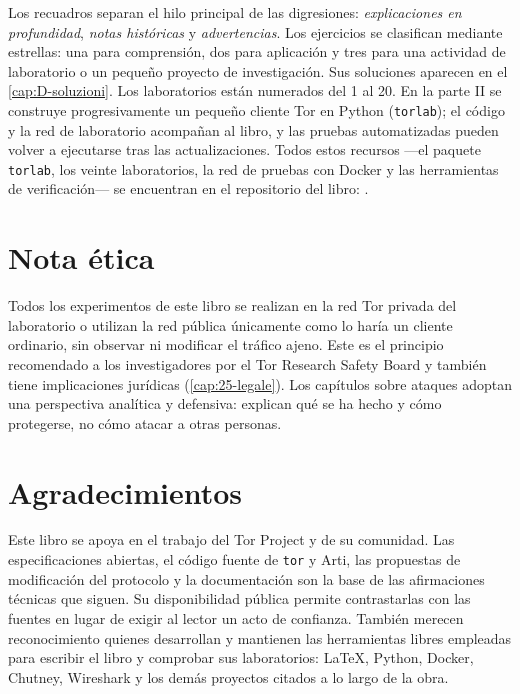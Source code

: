 Los recuadros separan el hilo principal de las digresiones: \emph{explicaciones en profundidad}, \emph{notas históricas} y \emph{advertencias}. Los ejercicios se clasifican mediante estrellas: una para comprensión, dos para aplicación y tres para una actividad de laboratorio o un pequeño proyecto de investigación. Sus soluciones aparecen en el \cref{cap:D-soluzioni}. Los laboratorios están numerados del 1 al 20. En la parte II se construye progresivamente un pequeño cliente Tor en Python (\texttt{torlab}); el código y la red de laboratorio acompañan al libro, y las pruebas automatizadas pueden volver a ejecutarse tras las actualizaciones. Todos estos recursos ---el paquete \texttt{torlab}, los veinte laboratorios, la red de pruebas con Docker y las herramientas de verificación--- se encuentran en el repositorio del libro: \repolibro.

\section*{Nota ética}

Todos los experimentos de este libro se realizan en la red Tor privada del laboratorio o utilizan la red pública únicamente como lo haría un cliente ordinario, sin observar ni modificar el tráfico ajeno. Este es el principio recomendado a los investigadores por el Tor Research Safety Board y también tiene implicaciones jurídicas (\cref{cap:25-legale}). Los capítulos sobre ataques adoptan una perspectiva analítica y defensiva: explican qué se ha hecho y cómo protegerse, no cómo atacar a otras personas.

\section*{Agradecimientos}

Este libro se apoya en el trabajo del Tor Project y de su comunidad. Las especificaciones abiertas, el código fuente de \texttt{tor} y Arti, las propuestas de modificación del protocolo y la documentación son la base de las afirmaciones técnicas que siguen. Su disponibilidad pública permite contrastarlas con las fuentes en lugar de exigir al lector un acto de confianza. También merecen reconocimiento quienes desarrollan y mantienen las herramientas libres empleadas para escribir el libro y comprobar sus laboratorios: \LaTeX{}, Python, Docker, Chutney, Wireshark y los demás proyectos citados a lo largo de la obra.
